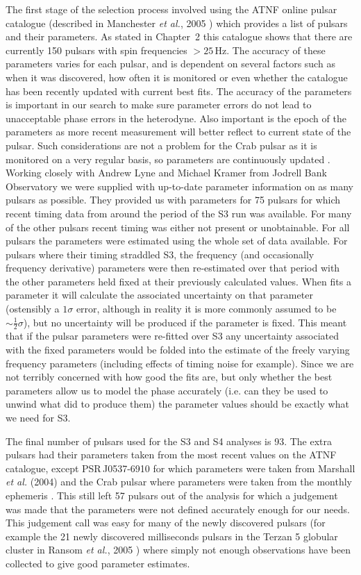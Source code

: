 The first stage of the selection process involved using the ATNF online pulsar catalogue
\cite{ATNF} (described in Manchester {\it et al.}, 2005 \cite{Manchester:2005}) which provides a
list of pulsars and their parameters. As stated in Chapter~2 this catalogue shows that there are
currently 150 pulsars with spin frequencies $> 25$\,Hz. The accuracy of these parameters varies for
each pulsar, and is dependent on several factors such as when it was discovered, how often it is
monitored or even whether the catalogue has been recently updated with current best fits. The
accuracy of the parameters is important in our search to make sure parameter errors do not lead to
unacceptable phase errors in the heterodyne. Also important is the epoch of the parameters as more
recent measurement will better reflect to current state of the pulsar. Such considerations are not a
problem for the Crab pulsar as it is monitored on a very regular basis, so parameters are
continuously updated \cite{CrabEphemeris}. Working closely with Andrew Lyne and Michael Kramer from
Jodrell Bank Observatory we were supplied with up-to-date parameter information on as many pulsars
as possible. They provided us with parameters for 75 pulsars for which recent timing data from
around the period of the S3 run was available. For many of the other pulsars recent timing was
either not present or unobtainable. For all pulsars the parameters were estimated using the whole
set of data available. For pulsars where their timing straddled S3, the frequency (and occasionally
frequency derivative) parameters were then re-estimated over that period with the other
parameters held fixed at their previously calculated values. When \tempo fits a parameter it will
calculate the associated uncertainty on that parameter (ostensibly a $1\sigma$ error, although in
reality it is more commonly assumed to be $\sim \frac{1}{2}\sigma$), but no uncertainty will be
produced if the parameter is fixed. This meant that if the pulsar parameters were re-fitted over S3
any uncertainty associated with the fixed parameters would be folded into the estimate of the freely
varying frequency parameters (including effects of timing noise for example). Since we are not
terribly concerned with how good the fits are, but only whether the best parameters allow us to
model the phase accurately (i.e. can they be used to unwind what \tempo did to produce them) the
parameter values should be exactly what we need for S3.

The final number of pulsars used for the S3 and S4 analyses is 93. The extra pulsars had their
parameters taken from the most recent values on the ATNF catalogue, except PSR\,J0537-6910 for which
parameters were taken from Marshall {\it et al.} (2004) \cite{Marshall:2004} and the Crab pulsar
where parameters were taken from the monthly ephemeris \cite{CrabEphemeris}. This still left 57
pulsars out of the analysis for which a judgement was made that the parameters were not defined
accurately enough for our needs. This judgement call was easy for many of the newly discovered
pulsars (for example the 21 newly discovered milliseconds pulsars in the Terzan 5 globular cluster
in Ransom {\it et al.}, 2005 \cite{Ransom:2005}) where simply not enough observations have been
collected to give good parameter estimates.
 
